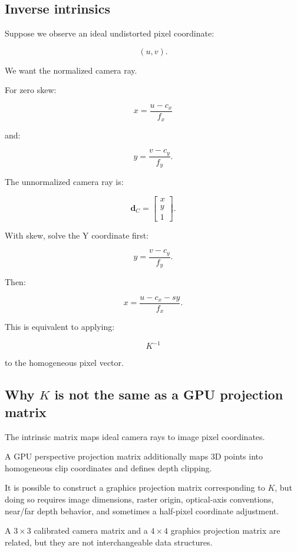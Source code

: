 \subsection{Inverse intrinsics}\label{02-foundations-ii-ch034-inverse-intrinsics}

Suppose we observe an ideal undistorted pixel coordinate:

\[
 (u,v).
\]

We want the normalized camera ray.

For zero skew:

\[
 \boxed{ x=\frac{u-c_x}{f_x} }
\]

and:

\[
 \boxed{ y=\frac{v-c_y}{f_y} }.
\]

The unnormalized camera ray is:

\[
 \boxed{ \mathbf d_C= \begin{bmatrix} x\\y\\1 \end{bmatrix} }.
\]

With skew, solve the Y coordinate first:

\[
 y=\frac{v-c_y}{f_y}.
\]

Then:

\[
 \boxed{ x=\frac{u-c_x-sy}{f_x} }.
\]

This is equivalent to applying:

\[
 K^{-1}
\]

to the homogeneous pixel vector.

\subsection{\texorpdfstring{Why \(K\) is not the same as a GPU projection matrix}{Why K is not the same as a GPU projection matrix}}\label{02-foundations-ii-ch034-why-k-is-not-the-same-as-a-gpu-projection-matrix}

The intrinsic matrix maps ideal camera rays to image pixel coordinates.

A GPU perspective projection matrix additionally maps 3D points into homogeneous clip coordinates and defines depth clipping.

It is possible to construct a graphics projection matrix corresponding to \(K\), but doing so requires image dimensions, raster origin, optical-axis conventions, near/far depth behavior, and sometimes a half-pixel coordinate adjustment.

A \(3\times3\) calibrated camera matrix and a \(4\times4\) graphics projection matrix are related, but they are not interchangeable data structures.

